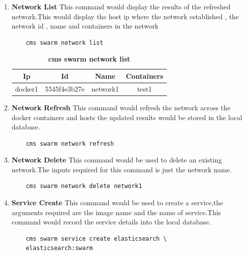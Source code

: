 \documentclass[9pt,twocolumn,twoside]{../../styles/osajnl}
\begin{document}
\begin{enumerate}
    \item \textbf{Network List}
     This command would display the results of the refreshed network.This would display the host ip where the network established , the network id , name and containers in the network\\
     
    \begin{verbatim}
    cms swarm network list  
    \end{verbatim}
    
    \begin{table}[htbp]
     \caption{\bf cms swarm network list }
     \begin{tabular}{cccc}
     \hline
      Ip & Id & Name & Containers\\
      \hline
      docker1 & 5545f4e3b27e & network1 & test1  \\
     \hline
     \end{tabular}
     \label{tab:tab6}
     \end{table}
     
    \item \textbf{Network Refresh}
    This command would refresh the network across the docker containers and hosts the updated results would be stored in the local database.
    
    \begin{verbatim}
    cms swarm network refresh  
    \end{verbatim}
    
    
    \item \textbf{Network Delete}
    This command would be used to delete an existing network.The inputs required for this command is just the network name.
    
    \begin{verbatim}
    cms swarm network delete network1  
    \end{verbatim}
    
    
    \item \textbf{Service Create}
    This command would be used to create a service,the arguments required are the image name and the name of service.This command would record the service details into the local database.\\
    
    \begin{verbatim}
    cms swarm service create elasticsearch \
    elasticsearch:swarm  
    \end{verbatim}
    

\end{enumerate}
\end{document}
